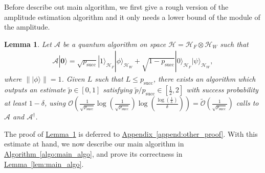 \documentclass[journal]{IEEEtran}
\newtheorem{lemma}{Lemma}
\newcommand{\lem}[1]{\hyperref[lem:#1]{Lemma~\ref*{lem:#1}}}
\newcommand{\algo}[1]{\hyperref[algo:#1]{Algorithm~\ref*{algo:#1}}}
\newcommand{\append}[1]{\hyperref[append:#1]{Appendix~\ref*{append:#1}}}
\begin{document}
Before describe out main algorithm, we first give a rough version of the amplitude estimation algorithm and it only needs a lower bound of the module of the amplitude.
\begin{lemma}
\label{lem:rough_amplitude_estimation}
Let $\mathcal{A}$ be a quantum algorithm on space $\mathcal{H} = \mathcal{H}_F\otimes \mathcal{H}_W$ such that
\begin{align}
\mathcal{A}|\mathbf{0}\rangle=\sqrt{p_{\mathrm{succ}}}|1\rangle_{\mathcal{H}_F}|\phi\rangle_{\mathcal{H}_W}\nonumber+\sqrt{1-p_{\mathrm{succ}}}|0\rangle_{\mathcal{H}_F}|\psi\rangle_{\mathcal{H}_W},
 \end{align} where $\||\phi\rangle \|=1$.
Given $L$ such that $L \le p_{\mathrm{succ}}$, there exists an algorithm which outputs an estimate $\tilde{p}\in[0,1]$ satisfying $\tilde{p}/p_{\mathrm{succ}}\in[\frac{1}{2},2]$ with success probability at least $1-\delta$, using $\mathcal{O}\left(\frac{1}{\sqrt{p_{\mathrm{succ}}}}\log(\frac{1}{\sqrt{p_{\mathrm{succ}}}})\log(\frac{\log(\frac{1}{L})}{\delta})\right) = \widetilde{\mathcal{O}}\left(\frac{1}{\sqrt{p_{\mathrm{succ}}}}\right)$ calls to $\mathcal{A} $ and $\mathcal{A}^{\dagger}$. 
\end{lemma}
The proof of \lem{rough_amplitude_estimation} is deferred to \append{other_proof}. With this estimate at hand, we now describe our main algorithm in \algo{main_algo}, and prove its correctness in \lem{main_algo}. 
\end{document}
